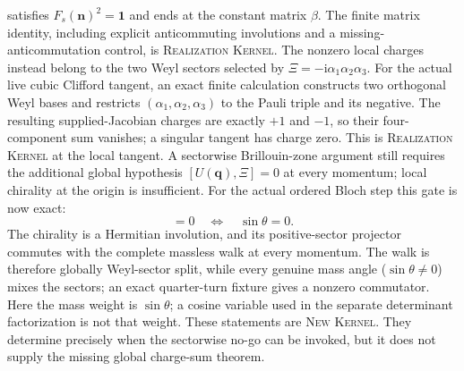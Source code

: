 \documentclass[11pt]{article}
\newcommand{\Kernel}{\textcolor{kernelcolor}{\textsc{Kernel}}}
\newcommand{\NewResult}{\textsc{New}}
\newcommand{\Realization}{\textsc{Realization}}
\newcommand{\ii}{\mathrm{i}}
\newcommand{\id}{\mathbf{1}}
\begin{document}
satisfies $F_s(\mathbf n)^2=\id$ and ends at the constant matrix $\beta$.
The finite matrix identity, including explicit anticommuting involutions and a
missing-anticommutation control, is \Realization{} \Kernel{}.  The nonzero
local charges instead belong to the two Weyl sectors selected by
$\Xi=-\ii\alpha_1\alpha_2\alpha_3$.  For the actual live cubic Clifford
tangent, an exact finite calculation constructs two orthogonal Weyl bases and
restricts $(\alpha_1,\alpha_2,\alpha_3)$ to the Pauli triple and its negative.
The resulting supplied-Jacobian charges are exactly $+1$ and $-1$, so their
four-component sum vanishes; a singular tangent has charge zero.  This is
\Realization{} \Kernel{} at the local tangent.  A sectorwise Brillouin-zone
argument still requires the additional global hypothesis
$[U(\mathbf q),\Xi]=0$ at every momentum; local chirality at the origin is
insufficient.  For the actual ordered Bloch step this gate is now exact:
\begin{equation}
 [U(\mathbf q,\theta),\Xi]=0
 \quad\Longleftrightarrow\quad
 \sin\theta=0.
\end{equation}
The chirality is a Hermitian involution, and its positive-sector projector
commutes with the complete massless walk at every momentum.  The walk is
therefore globally Weyl-sector split, while every genuine mass angle
($\sin\theta\ne0$) mixes the sectors; an exact quarter-turn fixture gives a
nonzero commutator.  Here the mass weight is $\sin\theta$; a cosine variable
used in the separate determinant factorization is not that weight.  These
statements are \NewResult{} \Kernel{}.  They determine precisely when the
sectorwise no-go can be invoked, but it does not supply the missing global
charge-sum theorem.
\end{document}
